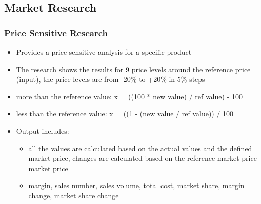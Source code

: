 \documentclass[11pt,titlepage,oneside,openany]{book}
\begin{document}
\subsection{Market Research}

\subsubsection{Price Sensitive Research}
    \begin{itemize}
        \item Provides a price sensitive analysis for a specific product
        \item The research shows the results for 9 price levels around the reference price (input), the price levels are from -20\% to +20\% in 5\% steps
        \item more than the reference value: x = ((100 * new value) / ref value) - 100
        \item less than the reference value: x = ((1 - (new value / ref value)) / 100
        \item Output includes: 
        \begin{itemize}
            \item all the values are calculated based on the actual values and the defined market price, changes are calculated based on the reference market price 
            market price
            \item margin, sales number, sales volume, total cost, market share, margin change, market share change
        \end{itemize}
        \end{itemize}
       
\end{document}

